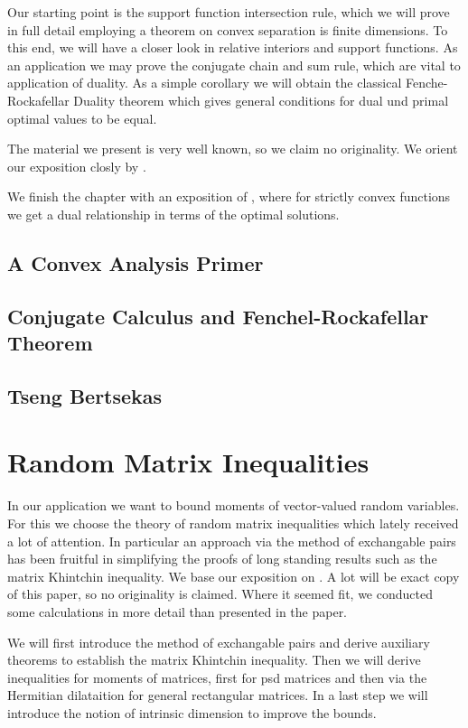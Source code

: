 \documentclass[12pt]{scrreport}
\theoremstyle{remark}
\theoremstyle{plain}
\begin{document}
Our starting point is the support function intersection rule, which we will prove in full detail employing a theorem on convex separation is finite dimensions.
To this end, we will have a closer look in relative interiors and support functions.
As an application we may prove the conjugate chain and sum rule,
which are vital to application of duality. As a simple corollary we will obtain the classical Fenche-Rockafellar Duality theorem
which gives general conditions for dual und primal optimal values to be equal.

The material we present is very well known, so we claim no originality. We orient our exposition closly by
\cite{Rockafellar1970, Mordukhovich2022}
.

We finish the chapter with an exposition of \cite{Tseng1991}, where for strictly convex functions we get a dual relationship in terms of the optimal solutions.
  \section{A Convex Analysis Primer}
  
  \section{Conjugate Calculus and Fenchel-Rockafellar Theorem}
  
%
  \section{Tseng Bertsekas}
  


\chapter{Random Matrix Inequalities}
  In our application we want to bound moments of vector-valued random variables.
  For this we choose the theory of random matrix inequalities
  which lately received a lot of attention.
  In particular an approach via the method of exchangable pairs \cite{Mackey2014}
  has been fruitful in simplifying the proofs of long standing results such as the matrix Khintchin inequality.
  We base our exposition on \cite{Mackey2014}. A lot will be exact copy of this paper, so no originality is claimed. Where it seemed fit, we conducted some calculations in more detail than presented in the paper. 

  We will first introduce the method of exchangable pairs and derive auxiliary theorems to establish the matrix Khintchin inequality.
  Then we will derive inequalities for moments of matrices, first for psd matrices and then via the Hermitian dilataition for general rectangular matrices. In a last step we will introduce the notion of intrinsic dimension to improve the bounds.
\end{document}
